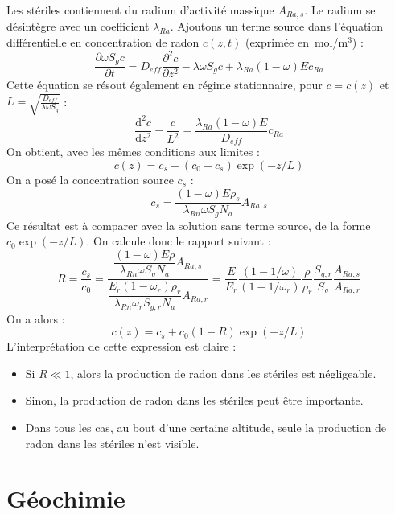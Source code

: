 \documentclass{article}
\begin{document}
Les stériles contiennent du radium d’activité massique $A_{Ra,s}$. Le radium se désintègre avec un coefficient $\lambda_{Ra}$. Ajoutons un terme source dans l’équation différentielle en concentration de radon $c(z,t)$ (exprimée en~mol/m$^3$) :
$$
\frac{\partial \omega S_g c}{\partial t} = D_{eff}  \frac{\partial^2 c}{\partial z^2}-\lambda \omega S_g c + \lambda_{Ra}(1-\omega)E c_{Ra}
$$
Cette équation se résout également en régime stationnaire, pour $c=c(z)$ et $L=\sqrt{\frac{D_{eff}}{\lambda \omega S_g }}$ :
$$
\frac{\text{d}^2 c}{\text{d}z^2} - \frac{c}{L^2}= \frac{\lambda_{Ra}(1-\omega)E}{D_{eff}} c_{Ra}
$$
On obtient, avec les mêmes conditions aux limites :
$$
c(z)= c_s + (c_0 - c_s) \exp(-z/L)
$$
On a posé la concentration source $c_s$ :
$$
c_s = \frac{(1-\omega)E\rho_s}{\lambda_{Rn}\omega S_g N_a} A_{Ra,s} 
$$
Ce résultat est à comparer avec la solution sans terme source, de la forme $c_0 \exp(-z/L)$. On calcule donc le rapport suivant :
$$
R=\dfrac{c_s}{c_0}= \dfrac{\dfrac{(1-\omega)E\rho}{\lambda_{Rn}\omega S_g N_a} A_{Ra,s}}{\dfrac{ E_r (1-\omega_r) \rho_r }{\lambda_{Rn} \omega_r S_{g,r} N_a} A_{Ra,r}} = \frac{E}{E_r} \frac{(1-1/\omega)}{(1-1/\omega_r)} \frac{\rho}{\rho_r} \frac{S_{g,r}}{S_g} \frac{A_{Ra,s}}{A_{Ra,r}}
$$
On a alors :
$$
c(z)=c_s + c_0(1-R) \exp(-z/L)
$$
L'interprétation de cette expression est claire :
\begin{itemize}
  \item Si $R\ll 1$, alors la production de radon dans les stériles est négligeable.
  \item Sinon, la production de radon dans les stériles peut être importante.
  \item Dans tous les cas, au bout d'une certaine altitude, seule la production de radon dans les stériles n'est visible.
\end{itemize}

\section{Géochimie}
\end{document}
